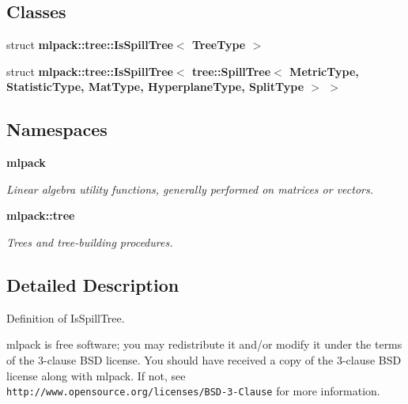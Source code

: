 \subsection*{Classes}
\begin{DoxyCompactItemize}
\item 
struct {\bf mlpack\+::tree\+::\+Is\+Spill\+Tree$<$ Tree\+Type $>$}
\item 
struct {\bf mlpack\+::tree\+::\+Is\+Spill\+Tree$<$ tree\+::\+Spill\+Tree$<$ Metric\+Type, Statistic\+Type, Mat\+Type, Hyperplane\+Type, Split\+Type $>$ $>$}
\end{DoxyCompactItemize}
\subsection*{Namespaces}
\begin{DoxyCompactItemize}
\item 
 {\bf mlpack}
\begin{DoxyCompactList}\small\item\em Linear algebra utility functions, generally performed on matrices or vectors. \end{DoxyCompactList}\item 
 {\bf mlpack\+::tree}
\begin{DoxyCompactList}\small\item\em Trees and tree-\/building procedures. \end{DoxyCompactList}\end{DoxyCompactItemize}


\subsection{Detailed Description}
Definition of Is\+Spill\+Tree. 

mlpack is free software; you may redistribute it and/or modify it under the terms of the 3-\/clause B\+SD license. You should have received a copy of the 3-\/clause B\+SD license along with mlpack. If not, see {\tt http\+://www.\+opensource.\+org/licenses/\+B\+S\+D-\/3-\/\+Clause} for more information. 